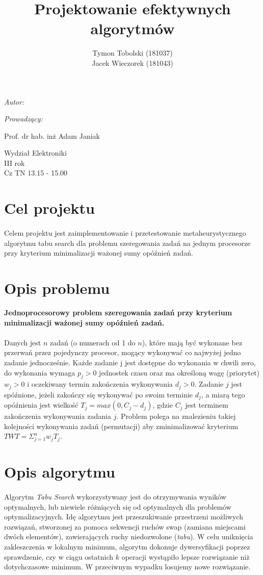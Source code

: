 \documentclass[wide,a4paper,titlepage,12pt] {article}
\title{Projektowanie efektywnych algorytmów}
\author{Tymon Tobolski (181037)\\ Jacek Wieczorek (181043)}
\makeatletter
\renewcommand{\maketitle}{
\begin{titlepage}
  \begin{center}
    \vspace*{3cm}
    \LARGE \@title \par
    \vspace{2cm}
    \textit{\small Autor:}\par
    \normalsize \@author\par \normalsize
    \vspace{3cm}
    \textit{\small Prowadzący:}\par
   Prof. dr hab. inż Adam Janiak \par
    \vspace{2cm}
    Wydział Elektroniki\\ III rok\\ Cz TN 13.15 - 15.00\par
    \vspace{4cm}
    \small \@date
  \end{center}
\end{titlepage}
}
\makeatother
\begin{document}
\maketitle

\section{Cel projektu}
\paragraph{}
  Celem projektu jest zaimplementowanie i przetestowanie metaheurystycznego algorytmu tabu search dla problemu szeregowania zadań na jednym procesorze przy kryterium minimalizacji ważonej sumy opóźnień zadań.

\section{Opis problemu}
{\bf Jednoprocesorowy problem szeregowania zadań przy kryterium
minimalizacji ważonej sumy opóźnień zadań.}

\paragraph{}
Danych jest $n$ zadań (o numerach od 1 do $n$), które mają być wykonane bez przerwań przez pojedynczy procesor, mogący wykonywać co najwyżej jedno zadanie jednocześnie.
Każde zadanie j jest dostępne do wykonania w chwili zero, do wykonania wymaga $p_{j} > 0$ jednostek czasu oraz ma określoną wagę (priorytet) $w_{j} > 0$ i oczekiwany termin zakończenia
wykonywania $d_{j} > 0$. Zadanie $j$ jest spóźnione, jeżeli zakończy się wykonywać po swoim terminie $d_{j}$, a miarą tego opóźnienia jest wielkość $T_{j} = max(0, C_{j} - d_{j} )$, gdzie $C_{j}$ jest terminem zakończenia
wykonywania zadania $j$. Problem polega na znalezieniu takiej kolejności wykonywania zadań (permutacji) aby zminimalizować kryterium $TWT = \Sigma_{j=1}^{n} w_{j} T_{j}$.

\section{Opis algorytmu}
\paragraph{}
Algorytm \textit{Tabu Search} wykorzystywany jest do otrzymywania wyników optymalnych, lub niewiele różniących się od optymalnych dla problemów optymalizacyjnych.
Idę algorytmu jest przeszukiwanie przestrzeni możliwych rozwiązań, stworzonej za pomoca sekwencji ruchów swap (zamiana miejscami dwóch elementów), zawierających ruchy niedozwolone (\textit{tabu}). W celu uniknięcia zakleszczenia w lokalnym minimum, algorytm dokonuje dywersyfikacji poprzez sprawdzenie, czy w ciągu ostatnich $k$ operacji wystąpiło lepsze rozwiązanie niż dotychczasowe minimum. W przeciwnym wypadku losujemy nowe rozwiązanie.
\end{document}
